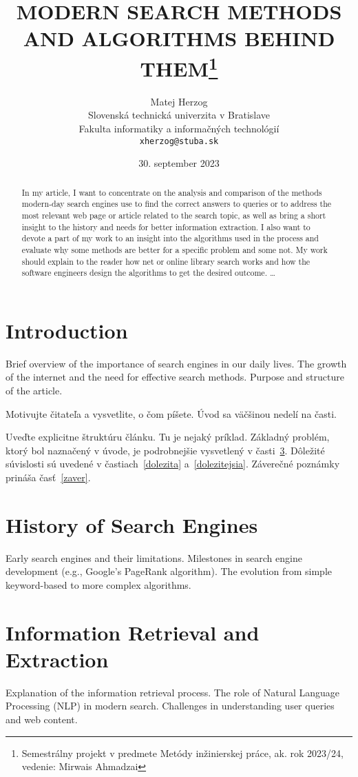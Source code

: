 \documentclass[14pt,twoside,slovak,a4paper]{coursepaper}
\title{MODERN SEARCH METHODS AND ALGORITHMS BEHIND THEM\thanks{Semestrálny projekt v predmete Metódy inžinierskej práce, ak. rok 2023/24, vedenie: Mirwais Ahmadzai}} %
\author{Matej Herzog\\[2pt]
	{\small Slovenská technická univerzita v Bratislave}\\
	{\small Fakulta informatiky a informačných technológií}\\
	{\small \texttt{xherzog@stuba.sk}}
	}
\date{\small 30. september 2023} %
\begin{document}
\begin{multicols}{2} %

\maketitle

\begin{abstract}
In my article, I want to concentrate on the analysis and comparison of the methods modern-day search engines use to find the correct answers to queries or to address the most relevant web page or article related to the search topic, as well as bring a short insight to the history and needs for better information extraction. I also want to devote a part of my work to an insight into the algorithms used in the process and evaluate why some methods are better for a specific problem and some not. My work should explain to the reader how net or online library search works and how the software engineers design the algorithms to get the desired outcome.
\ldots
\end{abstract}



\section{Introduction}
Brief overview of the importance of search engines in our daily lives.
The growth of the internet and the need for effective search methods.
Purpose and structure of the article.

Motivujte čitateľa a vysvetlite, o čom píšete. Úvod sa väčšinou nedelí na časti.

Uveďte explicitne štruktúru článku. Tu je nejaký príklad.
Základný problém, ktorý bol naznačený v úvode, je podrobnejšie vysvetlený v časti~\ref{nejaka}.
Dôležité súvislosti sú uvedené v častiach~\ref{dolezita} a~\ref{dolezitejsia}.
Záverečné poznámky prináša časť~\ref{zaver}.

\section{History of Search Engines}
Early search engines and their limitations.
Milestones in search engine development (e.g., Google's PageRank algorithm).
The evolution from simple keyword-based to more complex algorithms.

\section{Information Retrieval and Extraction} \label{nejaka}
Explanation of the information retrieval process.
The role of Natural Language Processing (NLP) in modern search.
Challenges in understanding user queries and web content.


\end{multicols}
\end{document}
